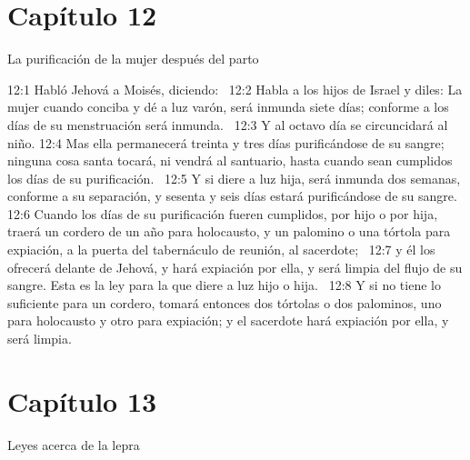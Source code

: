 \section*{Capítulo 12 }
La purificación de la mujer después del parto  

12:1 Habló Jehová a Moisés, diciendo:  
12:2 Habla a los hijos de Israel y diles: La mujer cuando conciba y dé a luz varón, será inmunda siete días; conforme a los días de su menstruación será inmunda.  
12:3 Y al octavo día se circuncidará al niño. 
12:4 Mas ella permanecerá treinta y tres días purificándose de su sangre; ninguna cosa santa tocará, ni vendrá al santuario, hasta cuando sean cumplidos los días de su purificación.  
12:5 Y si diere a luz hija, será inmunda dos semanas, conforme a su separación, y sesenta y seis días estará purificándose de su sangre.  
12:6 Cuando los días de su purificación fueren cumplidos, por hijo o por hija, traerá un cordero de un año para holocausto, y un palomino o una tórtola para expiación, a la puerta del tabernáculo de reunión, al sacerdote;  
12:7 y él los ofrecerá delante de Jehová, y hará expiación por ella, y será limpia del flujo de su sangre. Esta es la ley para la que diere a luz hijo o hija.  
12:8 Y si no tiene lo suficiente para un cordero, tomará entonces dos tórtolas o dos palominos, uno para holocausto y otro para expiación; y el sacerdote hará expiación por ella, y será limpia.  
\section*{Capítulo 13 }
Leyes acerca de la lepra  

